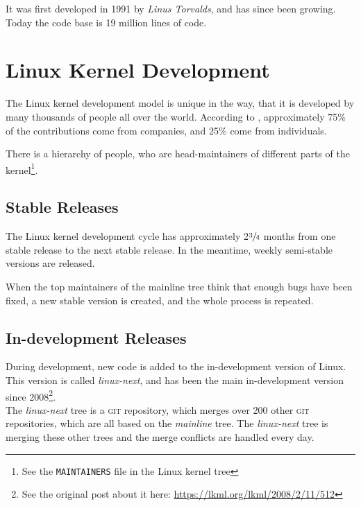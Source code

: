 \documentclass[a4paper,11pt]{report}
\newcommand{\f}{\footnote{\fn}}
\newcommand{\textcode}[1]{\fboxsep=1pt\texttt{\colorbox{gray!20}{#1}}}
\begin{document}
It was first developed in 1991 by \emph{Linus Torvalds}, and has since been 
growing. Today the code base is 19 million lines of code.


            \section{Linux Kernel Development}

            \def \fn {See the \textcode{MAINTAINERS} file in  
            the Linux kernel tree}

The Linux kernel development model is unique in the  way, that it is developed 
by many thousands of people all over the world. According to \cite{gkh}, 
approximately 75\% of the contributions come from companies, and 25\% come from 
individuals. 

There is a hierarchy of people, who are head-maintainers of different parts of 
the kernel\f.


            \subsection*{Stable Releases}

The Linux kernel development cycle has approximately 2$\sfrac{3}{4}$ months 
from one stable release to the next stable release\cite
    {crystalball}.
In the meantime, weekly semi-stable versions are released.

When the top maintainers of the mainline tree think that enough bugs have been 
fixed, a new stable version is created, and the whole process is repeated.


            \subsection*{In-development Releases}

            \def \fn {See the original post about it here: 
            \url{https://lkml.org/lkml/2008/2/11/512}}

During development, new code is added to the in-development version of Linux.
This version is called \emph{linux-next}, and has been the main in-development version
since 2008\f.
\\

The \emph{linux-next} tree is a \textsc{git} repository, which 
merges over 200 other \textsc{git} repositories\cite
    {nextTrees},
which are all based on the \emph{mainline} tree. The \emph{linux-next} tree is 
merging these other trees and the merge conflicts are handled every day.
\\
\end{document}
